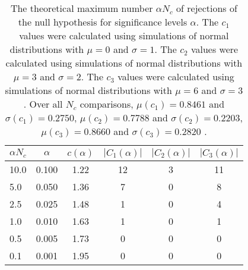 \begin{table}[h!]
\begin{center}
\begin{tabular}{| l | c | c | c | c | c |}\hline
$\alpha N_c$ & $\alpha$ & $c(\alpha)$ & $|C_1(\alpha)|$ & $|C_2(\alpha)|$ & $|C_3(\alpha)|$ \\\hline
10.0 & 0.100 & 1.22 & 12 & 3 & 11 \\\hline
5.0 & 0.050 & 1.36 & 7 & 0 & 8 \\\hline
2.5 & 0.025 & 1.48 & 1 & 0 & 4 \\\hline
1.0 & 0.010 & 1.63 & 1 & 0 & 1 \\\hline
0.5 & 0.005 & 1.73 & 0 & 0 & 0 \\\hline
0.1 & 0.001 & 1.95 & 0 & 0 & 0 \\\hline
\end{tabular}
\caption{The theoretical maximum number $\alpha N_c$ of rejections
        of the null hypothesis for significance levels $\alpha$.
        The $c_1$ values were calculated using simulations of normal distributions with $\mu=0$ and $\sigma=1$.
        The $c_2$ values were calculated using simulations of normal distributions with $\mu=3$ and $\sigma=2$.
        The $c_3$ values were calculated using simulations of normal distributions with $\mu=6$ and $\sigma=3$.
        Over all $N_c$ comparisons,
         $\mu(c_1)=0.8461$ and $\sigma(c_1)=0.2750$,
         $\mu(c_2)=0.7788$ and $\sigma(c_2)=0.2203$,
         $\mu(c_3)=0.8660$ and $\sigma(c_3)=0.2820$ .
        }
\end{center}
\end{table}